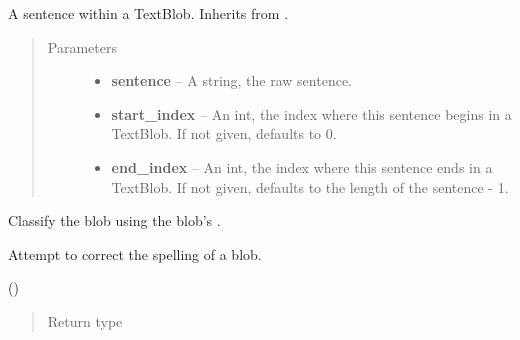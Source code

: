 \documentclass[letterpaper,10pt,english]{sphinxmanual}
\begin{document}
\begin{fulllineitems}
\label{api_reference:textblob_de.blob.Sentence}
A sentence within a TextBlob. Inherits from {\hyperref[api_reference:textblob_de.blob.BaseBlob]{}}.
\begin{quote}\begin{description}
\item[{Parameters}] \leavevmode\begin{itemize}
\item {} 
\textbf{sentence} -- A string, the raw sentence.

\item {} 
\textbf{start\_index} -- An int, the index where this sentence begins
in a TextBlob. If not given, defaults to 0.

\item {} 
\textbf{end\_index} -- An int, the index where this sentence ends in
a TextBlob. If not given, defaults to the
length of the sentence - 1.

\end{itemize}

\end{description}\end{quote}

\begin{fulllineitems}
\label{api_reference:textblob_de.blob.Sentence.classify}
Classify the blob using the blob's .

\end{fulllineitems}


\begin{fulllineitems}
\label{api_reference:textblob_de.blob.Sentence.correct}
Attempt to correct the spelling of a blob.

()
\begin{quote}\begin{description}
\item[{Return type}] \leavevmode
{\hyperref[api_reference:textblob_de.blob.BaseBlob]{}}


\end{description}
\end{quote}
\end{fulllineitems}
\end{fulllineitems}
\end{document}
